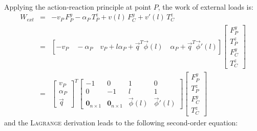 \documentclass[smallcondensed]{svjour3}     %
\begin{document}
Applying the action-reaction principle at point $P$, the work of external loads is:
\begin{eqnarray}
W_{ext} & = & -v_P\,F^y_P-\alpha_P\,T^z_P+v(l)\,F^y_C+v'(l)\,T^z_C \\
& = & [-v_P\quad -\alpha_P \quad v_P+l\alpha_P+\vec{q}^T\vec{\phi}(l) \quad \alpha_P+\vec{q}^T\vec{\phi}'(l)]\left[\begin{array}{c}F^y_P \\ T^z_P \\ F^y_C\\ T^z_C\end{array}\right] \\
& = & \left[\begin{array}{c}v_P\\ \alpha_P \\ \vec{q} \end{array}\right]^T\left[\begin{array}{cccc} -1 & 0 & 1 & 0\\0 & -1 & l & 1 \\ \mathbf{0}_{n\times 1} &\mathbf{0}_{n\times 1} & \vec{\phi}(l) & \vec{\phi}'(l) \end{array}\right]\left[\begin{array}{c}F^y_P \\ T^z_P \\ F^y_C\\ T^z_C\end{array}\right]
\end{eqnarray}
and the \textsc{Lagrange} derivation leads to the following second-order equation:
\end{document}
